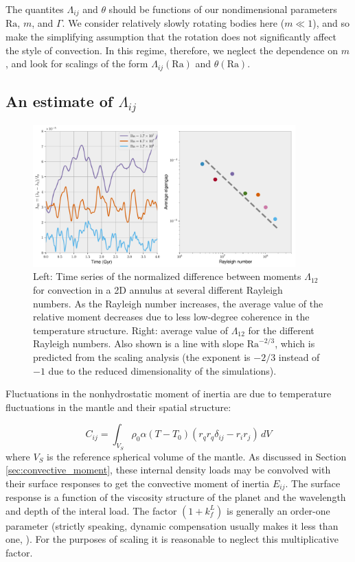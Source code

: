 \documentclass[extra,mreferee]{gji}
\begin{document}
The quantites $\Lambda_{ij}$ and $\theta$ should be functions of our nondimensional parameters $\mathrm{Ra}$, $m$, and $\Gamma$.  
We consider relatively slowly rotating bodies here ($m \ll 1$), and so make the simplifying assumption that the rotation does not significantly affect the style of convection.  
In this regime, therefore, we neglect the dependence on $m$, and look for scalings of the form $\Lambda_{ij}(\mathrm{Ra})$ and $\theta(\mathrm{Ra})$.


\subsection{An estimate of $\Lambda_{ij}$}
\label{sec:lambda}

\begin{figure}
\centering
\includegraphics[width=0.9\textwidth]{figures/eigengap.pdf}
\caption{ Left: Time series of the normalized difference between moments $\Lambda_{12}$ for convection in a 2D annulus at several different Rayleigh numbers.  As the Rayleigh number increases, the average value of the relative moment decreases due to less low-degree coherence in the temperature structure.  Right:  average value of $\Lambda_{12}$ for the different Rayleigh numbers.  Also shown is a line with slope $\mathrm{Ra}^{-2/3}$, which is predicted from the scaling analysis (the exponent is $-2/3$ instead of $-1$ due to the reduced dimensionality of the simulations).}
\label{fig:eigengap}
\end{figure}


Fluctuations in the nonhydrostatic moment of inertia are due to temperature fluctuations in the mantle and their spatial structure:

\begin{equation}
C_{ij} = \int_{V_S} \rho_0 \alpha (T-T_0) \left( r_q r_q \delta_{ij} - r_i r_j \right) \,dV
\label{eq:temperature_fluctuations}
\end{equation}
where $V_S$ is the reference spherical volume of the mantle.
As discussed in Section \ref{sec:convective_moment}, these internal density loads may be convolved with their surface responses to get the convective moment of inertia $E_{ij}$.
The surface response is a function of the viscosity structure of the planet and the wavelength and depth of the interal load.
The factor $(1+k^L_f)$ is generally an order-one parameter 
(strictly speaking, dynamic compensation usually makes it less than one, \citep[e.g.][]{richards1984geoid}). 
For the purposes of scaling it is reasonable to neglect this multiplicative factor.
\end{document}
